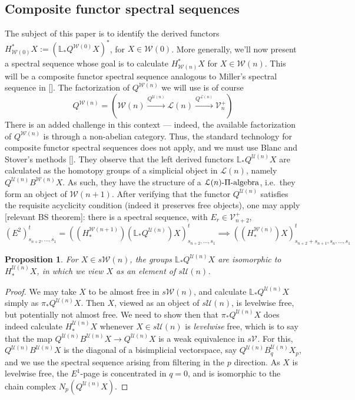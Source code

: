 \documentclass[11pt]{amsart}
\theoremstyle{plain}
\newtheorem{prop}[thm]{Proposition}
\theoremstyle{definition}
\renewcommand{\to}{\longrightarrow}
\newcommand{\calW}{\mathcal{W}}
\newcommand{\calU}{\mathcal{U}}
\newcommand{\calL}{\mathcal{L}}
\newcommand{\calV}{\mathcal{V}}
\theoremstyle{plain}
\newcommand{\vect}[2]{\calV^{#1}_{#2}}
\begin{document}
\begin{Composite functor spectral sequences}
\vfil\pagebreak
\section{Composite functor spectral sequences}
The subject of this paper is to identify the derived functors $H^*_{\calW(0)}X:=(\mathbb{L}_*Q^{\calW(0)}X)^*$, for $X\in\calW(0)$. More generally, we'll now present a spectral sequence whose goal is to calculate $H^*_{\calW(n)}X$ for $X\in\calW(n)$. This will be a composite functor spectral sequence analogous to Miller's spectral sequence in []. The factorization of $Q^{\calW(n)}$ we will use is of course 
\[Q^{\calW(n)}=\left(\calW(n)\overset{Q^{\calU(n)}}{\to}\calL(n)\overset{Q^{\calL(n)}}{\to}\vect{+}{n}\right)\]
There is an added challenge in this context --- indeed, the available factorization of $Q^{\calW(n)}$ is through a non-abelian category. Thus, the standard technology for composite functor spectral sequences does not apply, and we must use Blanc and Stover's methods []. They observe that the left derived functors $\mathbb{L}_*Q^{\calU(n)}X$ are calculated as the homotopy groups of a simplicial object in $\calL(n)$, namely $Q^{\calU(n)}B^{\calW(n)}X$. As such, they have the structure of a $\calL(n)\textup{-$\Pi$-algebra}$, i.e.\ they form an object of $\calW(n+1)$.  After verifying that the functor $Q^{\calU(n)}$ satisfies the requisite acyclicity condition (indeed it preserves free objects), one may apply [relevant BS theorem]: there is a spectral sequence, with $E_r\in\vect{+}{n+2}$,
\[(E^2)_{s_{n+2},\ldots,s_1}^t=((H_*^{\calW(n+1)})(\mathbb{L}_*Q^{\calU(n)})X)_{s_{n+2},\ldots,s_1}^t\implies ((H_*^{\calW(n)})X)_{s_{n+2}+s_{n+1},s_n,\ldots,s_1}^t\]
\begin{prop}
For $X\in s\calW(n)$, the groups $\mathbb{L}_*Q^{\calU(n)}X$ are isomorphic to $H_*^{\calU(n)}X$, in which we view $X$ as an element of $s\calU(n)$.
\end{prop}
\begin{proof}
We may take $X$ to be almost free in $s\calW(n)$, and calculate $\mathbb{L}_*Q^{\calU(n)}X$ simply as $\pi_*Q^{\calU(n)}X$. Then $X$, viewed as an object of $s\calU(n)$, is levelwise free, but potentially not almost free. We need to show then that $\pi_*Q^{\calU(n)}X$ does indeed calculate $H_*^{\calU(n)}X$ whenever $X\in s\calU(n)$ is \emph{levelwise} free, which is to say that the map $Q^{\calU(n)}B^{\calU(n)}X\to Q^{\calU(n)}X$ is a weak equivalence in $s\vect{}{}$. For this, $Q^{\calU(n)}B^{\calU(n)}X$ is the diagonal of a bisimplicial vectorspace, say $Q^{\calU(n)}B_q^{\calU(n)}X_p$, and we use the spectral sequence arising from filtering in the $p$ direction. As $X$ is levelwise free, the $E^1$-page is concentrated in $q=0$, and is isomorphic to the chain complex $N_p(Q^{\calU(n)}X)$.

\end{proof}
\end{Composite functor spectral sequences}
\end{document}
